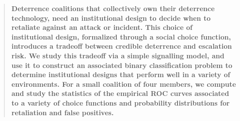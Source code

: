 
\begin{abstract}
    \textbf{Deterrence coalitions that collectively own their deterrence technology, need an institutional design to decide when to retaliate against an attack or incident. This choice of institutional design, formalized through a social choice function, introduces a tradeoff between credible deterrence and escalation risk. We study this tradeoff via a simple signalling model, and use it to construct an associated binary classification problem to determine institutional designs that perform well in a variety of environments. For a small coalition of four members, we compute and study the statistics of the empirical ROC curves associated to a variety of choice functions and probability distributions for retaliation and false positives.} 
\end{abstract} 

